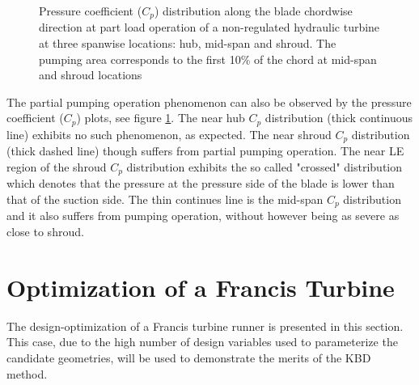\begin{figure}[h!]
\begin{minipage}[b]{1\linewidth}
 \centering
\end{minipage}
\caption{Pressure coefficient ($C_p$) distribution along the blade chordwise direction at part load operation of a non-regulated hydraulic turbine at three spanwise locations: hub, mid-span and shroud. The pumping area corresponds to the first 10\% of the chord at mid-span and shroud locations}
\label{design-pumpS2}
\end{figure}

The partial pumping operation phenomenon can also be observed by the pressure coefficient ($C_p$) plots, see figure \ref{design-pumpS2}. The near hub $C_p$ distribution (thick continuous line) exhibits no such phenomenon, as expected.  The near shroud $C_p$ distribution (thick dashed line) though suffers from partial pumping operation. The near LE region of the shroud $C_p$ distribution exhibits the so called "crossed" distribution which denotes that the pressure at the pressure side of the blade is lower than that of the suction side. The thin continues line is the mid-span $C_p$ distribution and it also suffers from pumping operation, without however being as severe as close to shroud.        
\FloatBarrier
\section{Optimization of a Francis Turbine} %
The design-optimization of a Francis turbine runner is presented in this section. This case, due to the high number of design variables used to parameterize the candidate geometries, will be used to demonstrate the merits of the KBD method. 
\label{Francis-runner}
